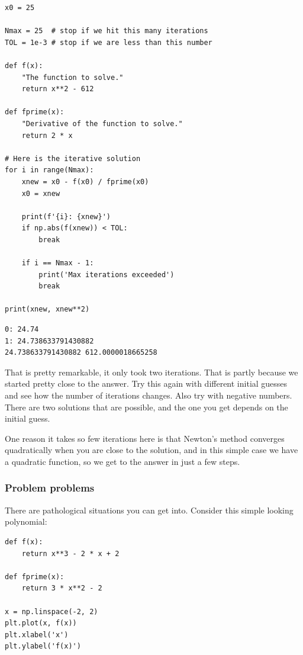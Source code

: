 \documentclass[11pt]{article}
\begin{document}
\begin{verbatim}
x0 = 25

Nmax = 25  # stop if we hit this many iterations
TOL = 1e-3 # stop if we are less than this number

def f(x):
    "The function to solve."
    return x**2 - 612

def fprime(x):
    "Derivative of the function to solve."
    return 2 * x

# Here is the iterative solution
for i in range(Nmax):
    xnew = x0 - f(x0) / fprime(x0)
    x0 = xnew

    print(f'{i}: {xnew}')
    if np.abs(f(xnew)) < TOL:
        break

    if i == Nmax - 1:
        print('Max iterations exceeded')
        break

print(xnew, xnew**2)
\end{verbatim}

\begin{verbatim}
0: 24.74
1: 24.738633791430882
24.738633791430882 612.0000018665258

\end{verbatim}

That is pretty remarkable, it only took two iterations. That is partly because we started pretty close to the answer. Try this again with different initial guesses and see how the number of iterations changes. Also try with negative numbers. There are two solutions that are possible, and the one you get depends on the initial guess.

One reason it takes so few iterations here is that Newton's method converges quadratically when you are close to the solution, and in this simple case we have a quadratic function, so we get to the answer in just a few steps.

\subsubsection{Problem problems}
\label{sec:org61551ad}

There are pathological situations you can get into. Consider this simple looking polynomial:

\begin{verbatim}
def f(x):
    return x**3 - 2 * x + 2

def fprime(x):
    return 3 * x**2 - 2

x = np.linspace(-2, 2)
plt.plot(x, f(x))
plt.xlabel('x')
plt.ylabel('f(x)')
\end{verbatim}
\end{document}
